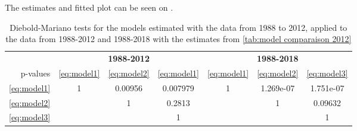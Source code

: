 \documentclass[12pt,a4paper,oneside]{book}
\begin{document}
The estimates and fitted plot can be seen on . 



\begin{table}[htp!]
     \centering \footnotesize
    \begin{tabular}{| r | c c c | c c c |}
 \multicolumn{1}{r}{} &    \multicolumn{3}{c}{\textbf{1988-2012}} &    \multicolumn{3}{c}{\textbf{1988-2018}} \\ \cline{2-7}
 \multicolumn{0}{r|}{p-values}	& \ref{eq:model1} & \ref{eq:model2} & \ref{eq:model1} & \ref{eq:model1} & \ref{eq:model2} & \ref{eq:model3} \\ \cline{1-7}
 \ref{eq:model1} & 1 & 0.00956 & 0.007979 & 1 & 1.269e-07 & 1.751e-07 \\ 
 \ref{eq:model2} &   & 1  & 0.2813 &   	  & 1 & 0.09632 \\
 \ref{eq:model3} &   &    & 1 &   &   & 1   \\ \cline{1-7}
\end{tabular}
    \caption{Diebold-Mariano tests for the models estimated with the data from 1988 to 2012, applied to the data from 1988-2012 and 1988-2018 with the estimates from \autoref{tab:model comparaison 2012}}
    \label{tab:Diebold Mariano 3}
\end{table}



\newpage
\end{document}
